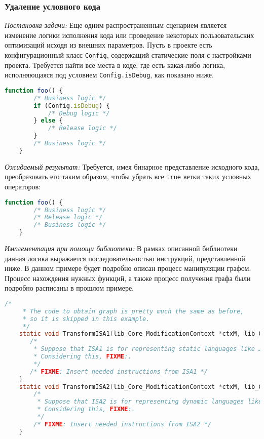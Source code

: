 \subsubsection{Удаление условного кода}

\textit{Постановка задачи:} Еще одним распространенным сценарием является изменение логики исполнения кода или проведение некоторых пользовательских оптимизаций исходя из внешних параметров. Пусть в проекте есть конфигурационный класс \texttt{Config}, содержащий статические поля с настройками проекта. Требуется найти все места в коде, где есть какая-либо логика, исполняющаяся под условием \texttt{Config.isDebug}, как показано ниже.

\begin{lstlisting}[language=javascript, label=lst:]
    function foo() {
        /* Business logic */
        if (Config.isDebug) {
            /* Debug logic */
        } else {
            /* Release logic */
        }
        /* Business logic */
    }
\end{lstlisting}

\textit{Ожидаемый результат:} Требуется, имея бинарное представление исходного кода, преобразовать его таким образом, чтобы убрать все \texttt{true} ветки таких условных операторов:

\begin{lstlisting}[language=javascript, label=lst:]
    function foo() {
        /* Business logic */
        /* Release logic */
        /* Business logic */
    }
\end{lstlisting}

\textit{Имплементация при помощи библиотеки:} В рамках описанной библиотеки данная логика выражается последовательностью инструкций, представленной ниже. В данном примере будет подробно описан процесс манипуляции графом. Процесс нахождения нужных функций, а также процесс получения графа были подробно расписаны в прошлом примере.

\begin{lstlisting}[language=C, label=lst:]
    /*
     * The code to obtain graph is pretty much the same as before,
     * so it is skipped in this example.
     */
    static void TransformISA1(lib_Core_ModificationContext *ctxM, lib_Core_Function* f, lib_Core_Graph* g) {
       /*
        * Suppose that ISA1 is for representing static languages like Java.
        * Considering this, FIXME:.
        */
       /* FIXME: Insert needed instructions from ISA1 */
    }
    static void TransformISA2(lib_Core_ModificationContext *ctxM, lib_Core_Function* f, lib_Core_Graph* g) {
        /*
         * Suppose that ISA2 is for representing dynamic languages like JavaScript.
         * Considering this, FIXME:.
         */
        /* FIXME: Insert needed instructions from ISA2 */
    }
\end{lstlisting}

